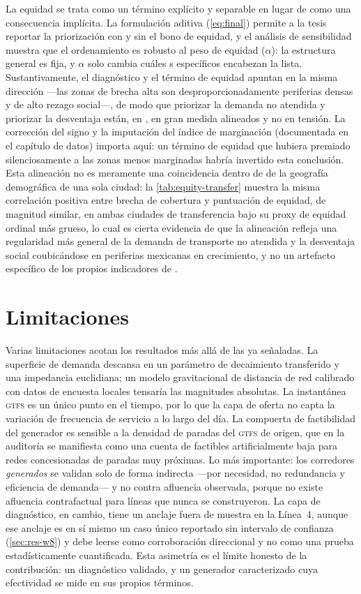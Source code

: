 La equidad se trata como un término explícito y separable en lugar de como una
consecuencia implícita. La formulación aditiva (\cref{eq:final}) permite a la tesis
reportar la priorización con y sin el bono de equidad, y el análisis de sensibilidad
muestra que el ordenamiento es robusto al peso de equidad ($\alpha$): la estructura
general es fija, y $\alpha$ solo cambia cuáles \ageb{}s específicos encabezan la lista.
Sustantivamente, el diagnóstico y el término de equidad apuntan en la misma dirección
---las zonas de brecha alta son desproporcionadamente periferias densas y de alto
rezago social---, de modo que priorizar la demanda no atendida y priorizar la
desventaja están, en \zmg, en gran medida alineados y no en tensión. La corrección del
signo y la imputación del índice de marginación (documentada en el capítulo de datos)
importa aquí: un término de equidad que hubiera premiado silenciosamente a las zonas
menos marginadas habría invertido esta conclusión. Esta alineación no es meramente una
coincidencia dentro de \zmg de la geografía demográfica de una sola ciudad: la
\cref{tab:equity-transfer} muestra la misma correlación positiva entre brecha de
cobertura y puntuación de equidad, de magnitud similar, en ambas ciudades de
transferencia bajo su proxy de equidad ordinal más grueso, lo cual es cierta evidencia
de que la alineación refleja una regularidad más general de la demanda de transporte no
atendida y la desventaja social coubicándose en periferias mexicanas en crecimiento, y
no un artefacto específico de los propios indicadores de \zmg.

\section{Limitaciones}
\label{sec:disc-limitations}

Varias limitaciones acotan los resultados más allá de las ya señaladas. La superficie
de demanda descansa en un parámetro de decaimiento transferido y una impedancia
euclidiana; un modelo gravitacional de distancia de red calibrado con datos de encuesta
locales tensaría las magnitudes absolutas. La instantánea \textsc{gtfs} es un único
punto en el tiempo, por lo que la capa de oferta no capta la variación de frecuencia de
servicio a lo largo del día. La compuerta de factibilidad del generador es sensible a
la densidad de paradas del \textsc{gtfs} de origen, que en la auditoría se manifiesta
como una cuenta de factibles artificialmente baja para redes concesionadas de paradas
muy próximas. Lo más importante: los corredores \emph{generados} se validan solo de
forma indirecta ---por necesidad, no redundancia y eficiencia de demanda--- y no contra
afluencia observada, porque no existe afluencia contrafactual para líneas que nunca se
construyeron. La capa de diagnóstico, en cambio, tiene un anclaje fuera de muestra en la
Línea~4, aunque ese anclaje es en sí mismo un caso único reportado sin intervalo de
confianza (\cref{sec:res-w8}) y debe leerse como corroboración direccional y no como una
prueba estadísticamente cuantificada. Esta asimetría es el límite honesto de la
contribución: un diagnóstico
validado, y un generador caracterizado cuya efectividad se mide en sus propios términos.

